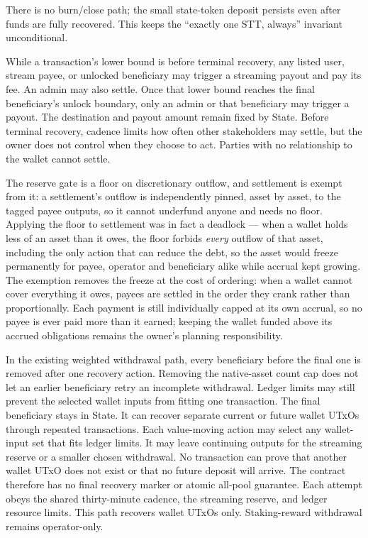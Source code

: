 \begin{description}[leftmargin=1.4em,style=nextline]
\item[Permanent state thread.] There is no burn/close path; the small state-token deposit persists even after funds are fully recovered. This keeps the ``exactly one STT, always'' invariant unconditional.
\item[Open settlement timing.] While a transaction's lower bound is before terminal recovery, any listed user, stream payee, or unlocked beneficiary may trigger a streaming payout and pay its fee. An admin may also settle. Once that lower bound reaches the final beneficiary's unlock boundary, only an admin or that beneficiary may trigger a payout. The destination and payout amount remain fixed by State. Before terminal recovery, cadence limits how often other stakeholders may settle, but the owner does not control when they choose to act. Parties with no relationship to the wallet cannot settle.
\item[Under-funded settlement is first-come, not pro-rata.] The reserve gate is a floor on discretionary outflow, and settlement is exempt from it: a settlement's outflow is independently pinned, asset by asset, to the tagged payee outputs, so it cannot underfund anyone and needs no floor. Applying the floor to settlement was in fact a deadlock --- when a wallet holds less of an asset than it owes, the floor forbids \emph{every} outflow of that asset, including the only action that can reduce the debt, so the asset would freeze permanently for payee, operator and beneficiary alike while accrual kept growing. The exemption removes the freeze at the cost of ordering: when a wallet cannot cover everything it owes, payees are settled in the order they crank rather than proportionally. Each payment is still individually capped at its own accrual, so no payee is ever paid more than it earned; keeping the wallet funded above its accrued obligations remains the owner's planning responsibility.
\item[Repeatable final-beneficiary recovery.] In the existing weighted withdrawal path, every beneficiary before the final one is removed after one recovery action. Removing the native-asset count cap does not let an earlier beneficiary retry an incomplete withdrawal. Ledger limits may still prevent the selected wallet inputs from fitting one transaction. The final beneficiary stays in State. It can recover separate current or future wallet UTxOs through repeated transactions. Each value-moving action may select any wallet-input set that fits ledger limits. It may leave continuing outputs for the streaming reserve or a smaller chosen withdrawal. No transaction can prove that another wallet UTxO does not exist or that no future deposit will arrive. The contract therefore has no final recovery marker or atomic all-pool guarantee. Each attempt obeys the shared thirty-minute cadence, the streaming reserve, and ledger resource limits. This path recovers wallet UTxOs only. Staking-reward withdrawal remains operator-only.

\end{description}
